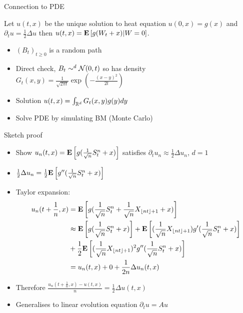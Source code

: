 \documentclass{beamer}
\begin{document}
\begin{frame}{Connection to PDE}
    \begin{thm}
        Let $u(t,x)$ be the unique solution to heat equation $u(0,x)=g(x)$ and $\partial_t u=\frac{1}{2}\Delta u$ then $u(t,x)={\mathbf E}\left[g(W_t+x)|W=0\right]$.
    \end{thm}
    \begin{itemize}
        \item $(B_t)_{t\geq0}$ is a random path
        \item Direct check, $B_t\sim^d\mathcal N(0,t)$ so has density $G_t(x,y)=\frac{1}{\sqrt{2\pi t}}\exp{(-\frac{(x-y)^2}{2t})}$
        \item Solution $u(t,x)=\int_{\mathbb{R}^d}G_t(x,y)g(y)dy$
        \item Solve PDE by simulating BM (Monte Carlo)
    \end{itemize}
\end{frame}

\begin{frame}{Sketch proof}
    \begin{itemize}
        \item Show $u_n(t,x)={\mathbf E}\left[g(\frac{1}{\sqrt{n}}S^n_t+x)\right]$ satisfies $\partial_tu_n\approx\frac{1}{2}\Delta u_n$, $d=1$
        \item $\frac{1}{2}\Delta u_n=\frac{1}{2}{\mathbf E}\left[g''(\frac{1}{\sqrt{n}}S^n_t+x)\right]$
        \item Taylor expansion:
        \begin{align*}
            u_n(t+\frac{1}{n},x)
            &={\mathbf E}\left[g(\frac{1}{\sqrt{n}}S^n_t+\frac{1}{\sqrt{n}}X_{\lfloor nt\rfloor+1}+x)\right]\\
            &\approx{\mathbf E}\left[g(\frac{1}{\sqrt{n}}S^n_t+x)\right]+{\mathbf E}\left[(\frac{1}{\sqrt{n}}X_{\lfloor nt\rfloor+1})g'(\frac{1}{\sqrt{n}}S^n_t+x)\right]\\
            &+\frac{1}{2}{\mathbf E}\left[(\frac{1}{\sqrt{n}}X_{\lfloor nt\rfloor+1})^2g''(\frac{1}{\sqrt{n}}S^n_t+x)\right]\\
            &=u_n(t,x)+0+\frac{1}{2n}\Delta u_n(t,x)
        \end{align*}
        \item Therefore $\frac{u_n(t+\frac{1}{n},x)-u(t,x)}{n}=\frac{1}{2}\Delta u(t,x)$
        \item Generalises to linear evolution equation $\partial_t u=Au$
    \end{itemize}
\end{frame}
\end{document}
